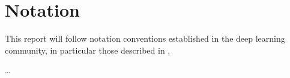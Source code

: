 \documentclass[../main.tex]{subfiles}
\begin{document}
\chapter*{Notation}

This report will follow notation conventions established in the deep learning community, in particular those described in \textcite{goodfellow2016}.



\dots{}
\end{document}
